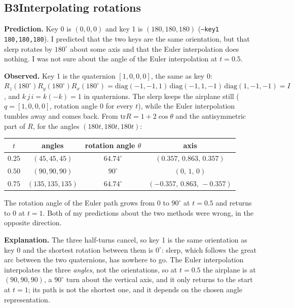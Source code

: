 \documentclass[10pt,a4paper]{article}
\newcommand{\experiment}[5]{%
  \subsection*{#1\quad #2}
  \textbf{Prediction.} #3\par
  \textbf{Observed.} #4\par
  \textbf{Explanation.} #5\par
}
\begin{document}
\experiment{B3}{Interpolating rotations}
  {Key 0 is $(0,0,0)$ and key 1 is $(180,180,180)$ (\texttt{--key1 180,180,180}). I predicted that the two keys
   are the same orientation, but that slerp rotates by $180^\circ$ about some axis and that the Euler
   interpolation does nothing. I was not sure about the angle of the Euler interpolation at $t=0.5$.}
  {Key 1 is the quaternion $[1,0,0,0]$, the same as key 0:
   $R_z(180^\circ)R_y(180^\circ)R_x(180^\circ)=\mathrm{diag}(-1,-1,1)\,\mathrm{diag}(-1,1,-1)\,\mathrm{diag}(1,-1,-1)=I$,
   and $k\,j\,i=k(-k)=1$ in quaternions. The slerp keeps the airplane still ($q=[1,0,0,0]$, rotation angle $0$ for
   every $t$), while the Euler interpolation tumbles away and comes back. From $\mathrm{tr}R=1+2\cos\theta$ and the
   antisymmetric part of $R$, for the angles $(180t,180t,180t)$:
   \begin{center}\small
   \begin{tabular}{cccc}\toprule
     $t$ & angles & rotation angle $\theta$ & axis\\\midrule
     $0.25$ & $(45,45,45)$ & $64.74^\circ$ & $(0.357,\,0.863,\,0.357)$\\
     $0.50$ & $(90,90,90)$ & $90^\circ$ & $(0,\,1,\,0)$\\
     $0.75$ & $(135,135,135)$ & $64.74^\circ$ & $(-0.357,\,0.863,\,-0.357)$\\\bottomrule
   \end{tabular}\end{center}
   The rotation angle of the Euler path grows from $0$ to $90^\circ$ at $t=0.5$ and returns to $0$ at $t=1$.
   Both of my predictions about the two methods were wrong, in the opposite direction.}
  {The three half-turns cancel, so key 1 is the same orientation as key 0 and the shortest rotation between them is
   $0^\circ$: slerp, which follows the great arc between the two quaternions, has nowhere to go. The Euler
   interpolation interpolates the three \emph{angles}, not the orientations, so at $t=0.5$ the airplane is at
   $(90,90,90)$, a $90^\circ$ turn about the vertical axis, and it only returns to the start at $t=1$; its path is
   not the shortest one, and it depends on the chosen angle representation.}
\end{document}
